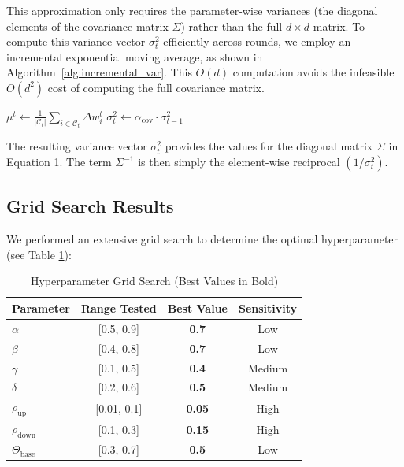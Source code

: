 \documentclass[lettersize,journal]{IEEEtran}
\begin{document}
This approximation only requires the parameter-wise variances (the diagonal elements of the covariance matrix $\Sigma$) rather than the full $d \times d$ matrix. To compute this variance vector $\sigma^2_t$ efficiently across rounds, we employ an incremental exponential moving average, as shown in Algorithm~\ref{alg:incremental_var}. This $O(d)$ computation avoids the infeasible $O(d^2)$ cost of computing the full covariance matrix.

\begin{algorithm}[h]
\caption{Incremental Variance Vector Update}
\label{alg:incremental_var}
\SetAlgoLined
\SetAlgoNoEnd
\scriptsize
{}
$\mu^t \leftarrow \frac{1}{|\mathcal{C}_t|} \sum_{i \in \mathcal{C}_t} \Delta w_i^t$\;
$\sigma^2_t \leftarrow \alpha_{\text{cov}} \cdot \sigma^2_{t-1}$\;
 
\end{algorithm}

The resulting variance vector $\sigma^2_t$ provides the values for the diagonal matrix $\Sigma$ in Equation 1. The term $\Sigma^{-1}$ is then simply the element-wise reciprocal $(1 / \sigma^2_t)$.

\subsection{Grid Search Results} \label{app:grid}

We performed an extensive grid search to determine the optimal hyperparameter (see Table \ref{tab:hyp}):

\begin{table}[h]
\centering
\caption{Hyperparameter Grid Search (Best Values in Bold)}
\label{tab:hyp}
\begin{tabular}{lccc}
\toprule
\textbf{Parameter} & \textbf{Range Tested} & \textbf{Best Value} & \textbf{Sensitivity} \\
\midrule
$\alpha$ & [0.5, 0.9] & \textbf{0.7} & Low \\
$\beta$ & [0.4, 0.8] & \textbf{0.7} & Low \\
$\gamma$ & [0.1, 0.5] & \textbf{0.4} & Medium \\
$\delta$ & [0.2, 0.6] & \textbf{0.5} & Medium \\
$\rho_{\text{up}}$ & [0.01, 0.1] & \textbf{0.05} & High \\
$\rho_{\text{down}}$ & [0.1, 0.3] & \textbf{0.15} & High \\
$\Theta_{\text{base}}$ & [0.3, 0.7] & \textbf{0.5} & Low \\
\bottomrule
\end{tabular}
\end{table}
\end{document}
